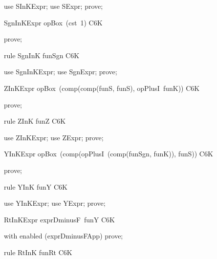 \documentclass{article}
\begin{document}
\begin{zproof}
use SInKExpr;
use SExpr;
prove;
\end{zproof}
\begin{theorem}{SgnInKExpr}
  opBox~(cst~1) \in C6K
\end{theorem}

\begin{zproof}
prove;
\end{zproof}

\begin{theorem}{rule SgnInK}
  funSgn \in C6K
\end{theorem}

\begin{zproof}
use SgnInKExpr;
use SgnExpr;
prove;
\end{zproof}
\begin{theorem}{ZInKExpr}
  opBox~(comp(comp(funS, funS), opPlusI~funK)) \in C6K
\end{theorem}

\begin{zproof}
prove;
\end{zproof}

\begin{theorem}{rule ZInK}
  funZ \in C6K
\end{theorem}

\begin{zproof}
use ZInKExpr;
use ZExpr;
prove;
\end{zproof}
\begin{theorem}{YInKExpr}
  opBox~(comp(opPlusI~(comp(funSgn, funK)), funS)) \in C6K
\end{theorem}

\begin{zproof}
prove;
\end{zproof}

\begin{theorem}{rule YInK}
  funY \in C6K
\end{theorem}

\begin{zproof}
use YInKExpr;
use YExpr;
prove;
\end{zproof}
\begin{theorem}{RtInKExpr}
  exprDminusF~funY \in C6K
\end{theorem}

\begin{zproof}
with enabled (exprDminusFApp) prove;
\end{zproof}

\begin{theorem}{rule RtInK}
  funRt \in C6K
\end{theorem}
\end{document}
